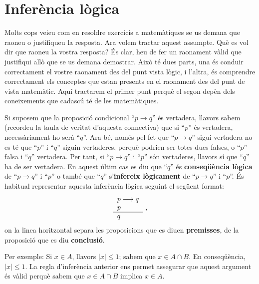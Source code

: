 \section{Inferència lògica}

Molts cops veieu com en resoldre exercicis a matemàtiques se us demana
que raoneu o justifiqueu la resposta. Ara volem tractar aquest assumpte. Què es vol dir que raoneu la vostra resposta? És clar, heu de fer un
raonament vàlid que justifiqui allò que se us demana demostrar. Això té dues parts, una és conduir correctament el vostre raonament
des del punt vista lògic, i l'altra, és comprendre correctament els
conceptes que estan presents en el raonament des del punt de vista matemàtic. Aquí tractarem el primer punt perquè el segon depèn dels
coneixements que cadascú té de les matemàtiques.

\bigskip

Si suposem que la proposició condicional \enquote{$p\rightarrow q$} és
vertadera, llavors sabem (recordeu la taula de veritat d'aquesta connectiva)
que si \enquote{$p$} és vertadera, necessàriament ho serà \enquote{$q$}. Ara bé, només pel fet que \enquote{$p\rightarrow q$} sigui vertadera no es té
que \enquote{$p$} i \enquote{$q$} siguin vertaderes, perquè podrien ser totes dues
falses, o \enquote{$p$} falsa i \enquote{$q$} vertadera. Per tant, si \enquote{$p\rightarrow q$} i \enquote{$p$} són vertaderes, llavors sí que \enquote{$q$} ha de ser vertadera. En
aquest últim cas es diu que \enquote{$q$} és \textbf{conseqüència lògica} de \enquote{$p\rightarrow q$} i \enquote{$p$} o també que \enquote{$q$} s'\textbf{infereix lògicament} de \enquote{$p\rightarrow q$} i \enquote{$p$}. És habitual
representar aquesta inferència lògica seguint el següent format:\begin{equation*}
\begin{tabular}{l}
$p\longrightarrow q$ \\
$p$ \\ \hline
$q$\end{tabular}
\ \text{,}
\end{equation*}
on la linea horitzontal separa les proposicions que es diuen \textbf{premisses}, de la proposició que es diu \textbf{conclusió}.

Per exemple: Si $x\in A$, llavors $\left\vert x\right\vert \leq1$; sabem que
$x\in A\cap B$. En conseqüència, $\left\vert x\right\vert \leq1$. La
regla d'inferència anterior ens permet assegurar que aquest argument
és vàlid perquè sabem que $x\in A\cap B$ implica $x\in A$.

